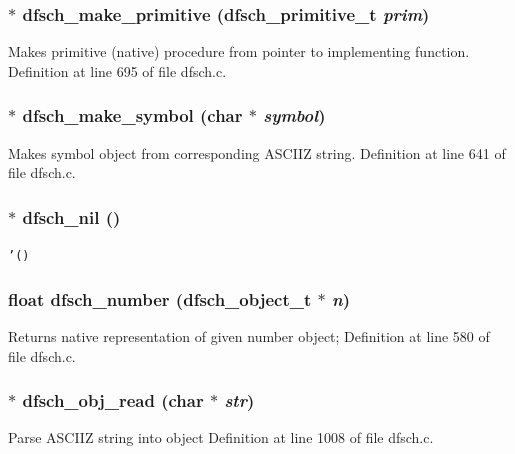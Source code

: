 \subsubsection{$\ast$ dfsch\_\-make\_\-primitive ({\bf dfsch\_\-primitive\_\-t} {\em prim})}\label{dfsch_8h_a38}


Makes primitive (native) procedure from pointer to implementing function. Definition at line 695 of file dfsch.c.
\subsubsection{$\ast$ dfsch\_\-make\_\-symbol (char $\ast$ {\em symbol})}\label{dfsch_8h_a31}


Makes symbol object from corresponding ASCIIZ string. Definition at line 641 of file dfsch.c.
\subsubsection{$\ast$ dfsch\_\-nil ()}\label{dfsch_8h_a23}


{\tt '()} 
\subsubsection{\setlength{\rightskip}{0pt plus 5cm}float dfsch\_\-number ({\bf dfsch\_\-object\_\-t} $\ast$ {\em n})}\label{dfsch_8h_a36}


Returns native representation of given number object; Definition at line 580 of file dfsch.c.
\subsubsection{$\ast$ dfsch\_\-obj\_\-read (char $\ast$ {\em str})}\label{dfsch_8h_a21}


Parse ASCIIZ string into object Definition at line 1008 of file dfsch.c.
